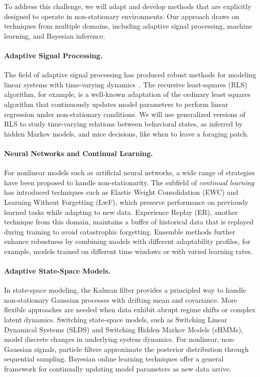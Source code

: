 To address this challenge, we will adapt and develop methods that are
explicitly designed to operate in non-stationary environments. Our approach
draws on techniques from multiple domains, including adaptive signal
processing, machine learning, and Bayesian inference.

\paragraph{Adaptive Signal Processing.}  

The field of adaptive signal processing has produced robust methods for
modeling linear systems with time-varying dynamics~\citep{haykin02}.
%
The recursive least-squares (RLS) algorithm, for example, is a well-known
adaptation of the ordinary least squares algorithm that continuously updates
model parameters to perform linear regression under non-stationary conditions.
%
We will use generalized versions of RLS to study time-varying relations between
behavioral states, as inferred by hidden Markov models, and mice decisions,
like when to leave a foraging patch.

\paragraph{Neural Networks and Continual Learning.}  

For nonlinear models such as artificial neural networks, a wide range of
strategies have been proposed to handle non-stationarity. The subfield of
\emph{continual learning} has introduced techniques such as Elastic Weight
Consolidation (EWC) and Learning Without Forgetting (LwF), which preserve
performance on previously learned tasks while adapting to new data. Experience
Replay (ER), another technique from this domain, maintains a buffer of
historical data that is replayed during training to avoid catastrophic
forgetting. Ensemble methods further enhance robustness by combining models
with different adaptability profiles, for example, models trained on different
time windows or with varied learning rates.

\paragraph{Adaptive State-Space Models.}  

In state-space modeling, the Kalman filter provides a principled way to handle
non-stationary Gaussian processes with drifting mean and covariance. More
flexible approaches are needed when data exhibit abrupt regime shifts or
complex latent dynamics. Switching state-space models, such as Switching Linear
Dynamical Systems (SLDS) and Switching Hidden Markov Models (sHMMs), model
discrete changes in underlying system dynamics. For nonlinear, non-Gaussian
signals, particle filters approximate the posterior distribution through
sequential sampling. Bayesian online learning techniques offer a general
framework for continually updating model parameters as new data arrive.

